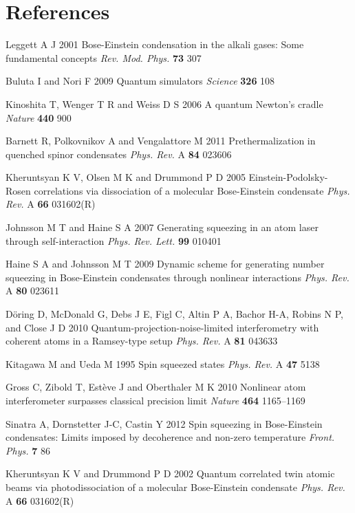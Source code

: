 \documentclass{iopart}
\begin{document}
\section*{References}
\begin{thebibliography}{10}

 Leggett A J 2001 Bose-Einstein condensation in the alkali gases: Some fundamental concepts \emph{Rev. Mod. Phys.} {\bf 73} 307 

 Buluta I and Nori F 2009 Quantum simulators \emph{Science} {\bf 326} 108

 Kinoshita T, Wenger T R and Weiss D S 2006 A quantum Newton's cradle \emph{Nature} {\bf 440} 900

 Barnett R, Polkovnikov A and Vengalattore M 2011 Prethermalization in quenched spinor condensates \emph{Phys. Rev.} A {\bf 84} 023606

 Kheruntsyan K V, Olsen M K and Drummond P D 2005 Einstein-Podolsky-Rosen correlations via dissociation of a molecular Bose-Einstein condensate \emph{Phys. Rev.} A {\bf 66} 031602(R)

 Johnsson M T and Haine S A 2007 Generating squeezing in an atom laser through self-interaction \emph{Phys. Rev. Lett.} {\bf 99} 010401

 Haine S A and Johnsson M T 2009 Dynamic scheme for generating number squeezing in Bose-Einstein condensates through nonlinear interactions \emph{Phys. Rev.} A {\bf 80} 023611

 D{\"{o}}ring D, McDonald G, Debs J E, Figl C, Altin P A, Bachor H-A, Robins N P, and Close J D 2010 Quantum-projection-noise-limited interferometry with coherent atoms in a Ramsey-type setup \emph{Phys. Rev.} A {\bf 81} 043633

 Kitagawa M and Ueda M 1995 Spin squeezed states \emph{Phys. Rev.} A {\bf 47} 5138

 Gross C, Zibold T, Est{\`{e}}ve J and Oberthaler M K 2010 Nonlinear atom interferometer surpasses classical precision limit \emph{Nature} {\bf 464} 1165--1169

 Sinatra A, Dornstetter J-C, Castin Y 2012 Spin squeezing in Bose-Einstein condensates: Limits imposed by decoherence and non-zero temperature \emph{Front. Phys.} {\bf 7} 86

 Kheruntsyan K V and Drummond P D 2002 Quantum correlated twin atomic beams via photodissociation of a molecular Bose-Einstein condensate \emph {Phys. Rev.} A {\bf 66} 031602(R)


\end{thebibliography}
\end{document}
